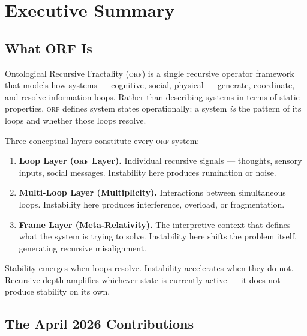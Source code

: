 \documentclass[12pt,a4paper]{article}
\theoremstyle{definition}
\newcommand{\orf}{\textsc{orf}}
\begin{document}
\tableofcontents
\newpage

\section{Executive Summary}

\subsection{What ORF Is}

Ontological Recursive Fractality (\orf{}) is a single recursive operator
framework that models how systems — cognitive, social, physical — generate,
coordinate, and resolve information loops.  Rather than describing systems in
terms of static properties, \orf{} defines system states operationally: a
system \emph{is} the pattern of its loops and whether those loops resolve.

Three conceptual layers constitute every \orf{} system:

\begin{enumerate}[leftmargin=*]
  \item \textbf{Loop Layer (\orf{} Layer).}  Individual recursive signals —
        thoughts, sensory inputs, social messages.  Instability here produces
        rumination or noise.
  \item \textbf{Multi-Loop Layer (Multiplicity).}  Interactions between
        simultaneous loops.  Instability here produces interference, overload,
        or fragmentation.
  \item \textbf{Frame Layer (Meta-Relativity).}  The interpretive context
        that defines what the system is trying to solve.  Instability here
        shifts the problem itself, generating recursive misalignment.
\end{enumerate}

\begin{tcolorbox}[finding,title={Core Principle}]
  Stability emerges when loops resolve.  Instability accelerates when they
  do not.  Recursive depth amplifies whichever state is currently active —
  it does not produce stability on its own.
\end{tcolorbox}

\subsection{The April 2026 Contributions}
\end{document}
